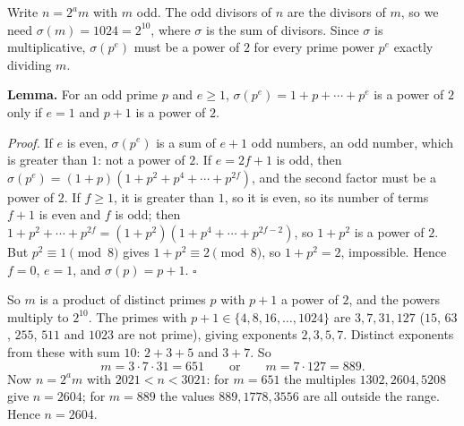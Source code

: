 Write $n=2^a m$ with $m$ odd. The odd divisors of $n$ are the divisors of $m$, so we need $\sigma(m)=1024=2^{10}$, where $\sigma$ is the sum of divisors. Since $\sigma$ is multiplicative, $\sigma\left(p^e\right)$ must be a power of $2$ for every prime power $p^e$ exactly dividing $m$.

\textbf{Lemma.} For an odd prime $p$ and $e\ge1$, $\sigma\left(p^e\right)=1+p+\cdots+p^e$ is a power of $2$ only if $e=1$ and $p+1$ is a power of $2$.

\emph{Proof.} If $e$ is even, $\sigma\left(p^e\right)$ is a sum of $e+1$ odd numbers, an odd number, which is greater than $1$: not a power of $2$. If $e=2f+1$ is odd, then $\sigma\left(p^e\right)=(1+p)\left(1+p^2+p^4+\cdots+p^{2f}\right)$, and the second factor must be a power of $2$. If $f\ge1$, it is greater than $1$, so it is even, so its number of terms $f+1$ is even and $f$ is odd; then $1+p^2+\cdots+p^{2f}=\left(1+p^2\right)\left(1+p^4+\cdots+p^{2f-2}\right)$, so $1+p^2$ is a power of $2$. But $p^2\equiv1\pmod 8$ gives $1+p^2\equiv2\pmod 8$, so $1+p^2=2$, impossible. Hence $f=0$, $e=1$, and $\sigma(p)=p+1$. $\square$

So $m$ is a product of distinct primes $p$ with $p+1$ a power of $2$, and the powers multiply to $2^{10}$. The primes with $p+1\in\{4,8,16,\dots,1024\}$ are $3,7,31,127$ ($15$, $63$, $255$, $511$ and $1023$ are not prime), giving exponents $2,3,5,7$. Distinct exponents from these with sum $10$: $2+3+5$ and $3+7$. So
\[m=3\cdot7\cdot31=651\qquad\text{or}\qquad m=7\cdot127=889.\]
Now $n=2^am$ with $2021<n<3021$: for $m=651$ the multiples $1302,2604,5208$ give $n=2604$; for $m=889$ the values $889,1778,3556$ are all outside the range. Hence $n=\boxed{2604}$.
